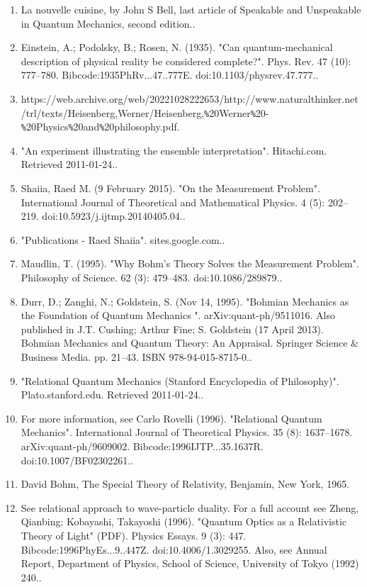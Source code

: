\begin{enumerate}
\item La nouvelle cuisine, by John S Bell, last article of Speakable and Unspeakable in Quantum Mechanics, second edition..
\item Einstein, A.; Podolsky, B.; Rosen, N. (1935). "Can quantum-mechanical description of physical reality be considered complete?". Phys. Rev. 47 (10): 777–780. Bibcode:1935PhRv...47..777E. doi:10.1103/physrev.47.777..
\item https://web.archive.org/web/20221028222653/http://www.naturalthinker.net/trl/texts/Heisenberg,Werner/Heisenberg,\verb|%|20Werner\verb|%|20-\verb|%|20Physics\verb|%|20and\verb|%|20philosophy.pdf.
\item "An experiment illustrating the ensemble interpretation". Hitachi.com. Retrieved 2011-01-24..
\item Shaiia, Raed M. (9 February 2015). "On the Measurement Problem". International Journal of Theoretical and Mathematical Physics. 4 (5): 202–219. doi:10.5923/j.ijtmp.20140405.04..
\item "Publications - Raed Shaiia". sites.google.com..
\item Maudlin, T. (1995). "Why Bohm's Theory Solves the Measurement Problem". Philosophy of Science. 62 (3): 479–483. doi:10.1086/289879..
\item Durr, D.; Zanghi, N.; Goldstein, S. (Nov 14, 1995). "Bohmian Mechanics as the Foundation of Quantum Mechanics ". arXiv:quant-ph/9511016. Also published in J.T. Cushing; Arthur Fine; S. Goldstein (17 April 2013). Bohmian Mechanics and Quantum Theory: An Appraisal. Springer Science & Business Media. pp. 21–43. ISBN 978-94-015-8715-0..
\item "Relational Quantum Mechanics (Stanford Encyclopedia of Philosophy)". Plato.stanford.edu. Retrieved 2011-01-24..
\item For more information, see Carlo Rovelli (1996). "Relational Quantum Mechanics". International Journal of Theoretical Physics. 35 (8): 1637–1678. arXiv:quant-ph/9609002. Bibcode:1996IJTP...35.1637R. doi:10.1007/BF02302261..
\item David Bohm, The Special Theory of Relativity, Benjamin, New York, 1965.
\item See relational approach to wave-particle duality. For a full account see Zheng, Qianbing; Kobayashi, Takayoshi (1996). "Quantum Optics as a Relativistic Theory of Light" (PDF). Physics Essays. 9 (3): 447. Bibcode:1996PhyEs...9..447Z. doi:10.4006/1.3029255. Also, see Annual Report, Department of Physics, School of Science, University of Tokyo (1992) 240..

\end{enumerate}
